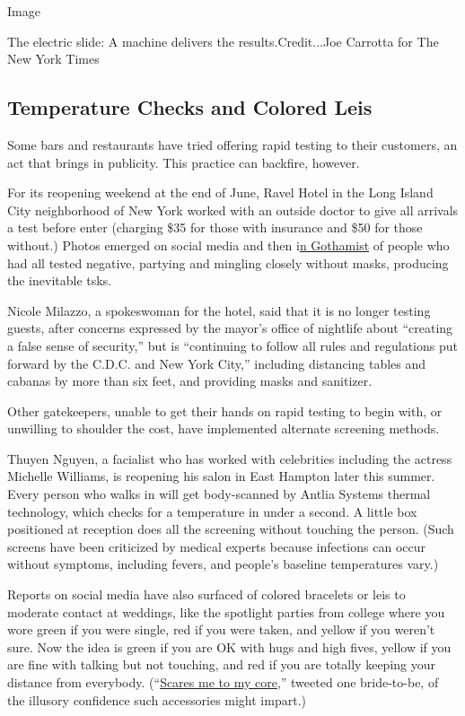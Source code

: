 Image

The electric slide: A machine delivers the results.Credit...Joe Carrotta
for The New York Times

\hypertarget{temperature-checks-and-colored-leis}{%
\subsection{Temperature Checks and Colored
Leis}\label{temperature-checks-and-colored-leis}}

Some bars and restaurants have tried offering rapid testing to their
customers, an act that brings in publicity. This practice can backfire,
however.

For its reopening weekend at the end of June, Ravel Hotel in the Long
Island City neighborhood of New York worked with an outside doctor to
give all arrivals a test before enter (charging \$35 for those with
insurance and \$50 for those without.) Photos emerged on social media
and then
i\href{https://gothamist.com/arts-entertainment/profundo-ravel-covid-test-rooftop-pandemic-pool-parties-rage-lic}{n
Gothamist} of people who had all tested negative, partying and mingling
closely without masks, producing the inevitable tsks.

Nicole Milazzo, a spokeswoman for the hotel, said that it is no longer
testing guests, after concerns expressed by the mayor's office of
nightlife about ``creating a false sense of security,'' but is
``continuing to follow all rules and regulations put forward by the
C.D.C. and New York City,'' including distancing tables and cabanas by
more than six feet, and providing masks and sanitizer.

Other gatekeepers, unable to get their hands on rapid testing to begin
with, or unwilling to shoulder the cost, have implemented alternate
screening methods.

Thuyen Nguyen, a facialist who has worked with celebrities including the
actress Michelle Williams, is reopening his salon in East Hampton later
this summer. Every person who walks in will get body-scanned by Antlia
Systems thermal technology, which checks for a temperature in under a
second. A little box positioned at reception does all the screening
without touching the person. (Such screens have been criticized by
medical experts because infections can occur without symptoms, including
fevers, and people's baseline temperatures vary.)

Reports on social media have also surfaced of colored bracelets or leis
to moderate contact at weddings, like the spotlight parties from college
where you wore green if you were single, red if you were taken, and
yellow if you weren't sure. Now the idea is green if you are OK with
hugs and high fives, yellow if you are fine with talking but not
touching, and red if you are totally keeping your distance from
everybody.
(``\href{https://twitter.com/Erin_Alexa_/status/1292476550399561736/}{Scares
me to my core},'' tweeted one bride-to-be, of the illusory confidence
such accessories might impart.)

